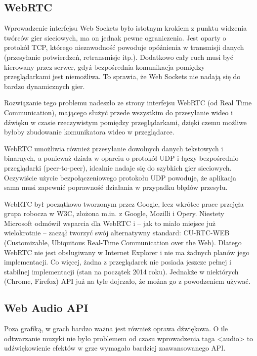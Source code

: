 \subsection{WebRTC}
\label{ssec:webrtc}

Wprowadzenie interfejsu Web Sockets było istotnym krokiem z punktu widzenia twórców gier
sieciowych, ma on jednak pewne ograniczenia. Jest oparty o protokół TCP, którego 
niezawodność powoduje opóźnienia w transmisji danych (przesyłanie potwierdzeń,
retransmisje itp.). Dodatkowo cały ruch musi być kierowany przez serwer, gdyż bezpośrednia
komunikacja pomiędzy przeglądarkami jest niemożliwa. To sprawia, że Web Sockets nie nadają
się do bardzo dynamicznych gier.

Rozwiązanie tego problemu nadeszło ze strony interfejsu WebRTC (od Real Time Communication),
mającego służyć przede wszystkim
do przesyłanie wideo i dźwięku w czasie rzeczywistym pomiędzy przeglądarkami, dzięki czemu
możliwe byłoby zbudowanie komunikatora wideo w przeglądarce.

WebRTC umożliwia również przesyłanie dowolnych danych tekstowych i binarnych, a ponieważ
działa w oparciu o protokół UDP i łączy bezpośrednio przeglądarki (peer-to-peer), idealnie
nadaje się do szybkich gier sieciowych. Oczywiście użycie  bezpołączeniowego protokołu UDP
powoduje, że aplikacja sama musi zapewnić poprawność działania w przypadku błędów przesyłu. 

WebRTC był początkowo tworzonym przez Google, lecz wkrótce prace przejęła grupa robocza w W3C,
złożona m.in. z Google, Mozilli i Opery. Niestety Microsoft odmówił wsparcia dla WebRTC i  -- jak
to miało miejsce już wielokrotnie -- zaczął tworzyć swój alternatywny standard: CU-RTC-WEB
(Customizable, Ubiquitous Real-Time Communication over the Web). Dlatego WebRTC nie jest
obsługiwany w Internet Explorer i nie ma żadnych planów jego implementacji. Co więcej,
żadna z przeglądarek nie posiada jeszcze pełnej i stabilnej implementacji (stan na
początek 2014 roku). Jednakże w niektórych (Chrome, Firefox) API już na tyle dojrzało, że
można go z powodzeniem używać.

\subsection{Web Audio API}
\label{ssec:webAudio}

Poza grafiką, w grach bardzo ważna jest również oprawa dźwiękowa. O ile odtwarzanie muzyki
nie było problemem od czasu wprowadzenia taga <audio> to udźwiękowienie efektów w grze
wymagało bardziej zaawansowanego API.

